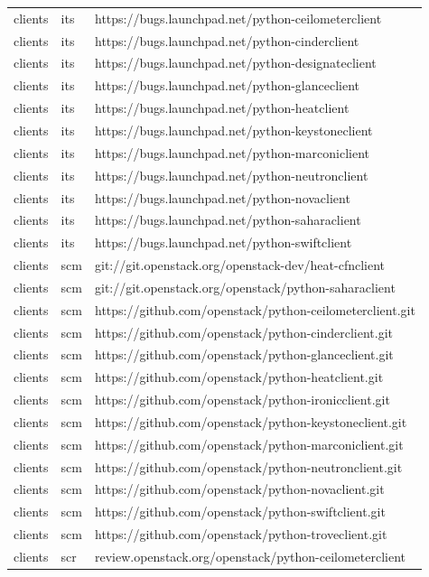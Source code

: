 \documentclass[a4wide,11pt]{report}
\begin{document}
\begin{center}
\begin{longtable}{|p{4cm}|p{1cm}|p{10cm}|}
clients&its&https://bugs.launchpad.net/python-ceilometerclient\\ 
clients&its&https://bugs.launchpad.net/python-cinderclient\\ 
clients&its&https://bugs.launchpad.net/python-designateclient\\ 
clients&its&https://bugs.launchpad.net/python-glanceclient\\ 
clients&its&https://bugs.launchpad.net/python-heatclient\\ 
clients&its&https://bugs.launchpad.net/python-keystoneclient\\ 
clients&its&https://bugs.launchpad.net/python-marconiclient\\ 
clients&its&https://bugs.launchpad.net/python-neutronclient\\ 
clients&its&https://bugs.launchpad.net/python-novaclient\\ 
clients&its&https://bugs.launchpad.net/python-saharaclient\\ 
clients&its&https://bugs.launchpad.net/python-swiftclient\\ 
clients&scm&git://git.openstack.org/openstack-dev/heat-cfnclient\\ 
clients&scm&git://git.openstack.org/openstack/python-saharaclient\\ 
clients&scm&https://github.com/openstack/python-ceilometerclient.git\\ 
clients&scm&https://github.com/openstack/python-cinderclient.git\\ 
clients&scm&https://github.com/openstack/python-glanceclient.git\\ 
clients&scm&https://github.com/openstack/python-heatclient.git\\ 
clients&scm&https://github.com/openstack/python-ironicclient.git\\ 
clients&scm&https://github.com/openstack/python-keystoneclient.git\\ 
clients&scm&https://github.com/openstack/python-marconiclient.git\\ 
clients&scm&https://github.com/openstack/python-neutronclient.git\\ 
clients&scm&https://github.com/openstack/python-novaclient.git\\ 
clients&scm&https://github.com/openstack/python-swiftclient.git\\ 
clients&scm&https://github.com/openstack/python-troveclient.git\\ 
clients&scr&review.openstack.org/openstack/python-ceilometerclient\\ 

\end{longtable}
\end{center}
\end{document}
